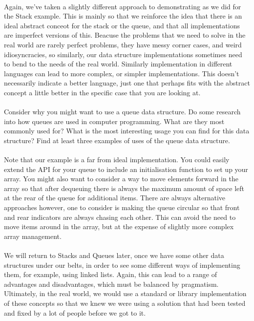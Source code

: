 \documentclass[10pt, a4paper, twosize]{article}
\begin{document}
\paragraph{} Again, we've taken a slightly different approach to demonstrating as we did for the Stack example. This is mainly so that we reinforce the idea that there is an ideal abstract conceot for the stack or the queue, and that all implementations are imperfect versions of this. Beacuse the problems that we need to solve in the real world are rarely perfect problems, they have messy corner cases, and weird idiosyncracies, so similarly, our data structure implementations sometimes need to bend to the needs of the real world. Similarly implementation in different languages can lead to more complex, or simpler implementations. This doesn't necessarily indicate a better language, just one that perhaps fits with the abstract concept a little better in the specific case that you are looking at.

\paragraph{} Consider why you might want to use a queue data structure. Do some research into how queues are used in computer programming. What are they most commonly used for? What is the most interesting usage you can find for this data structure? Find at least three examples of uses of the queue data structure.

\paragraph{} Note that our example is a far from ideal implementation. You could easily extend the API for your queue to include an initialisation function to set up your array. You might also want to consider a way to move elements forward in the array so that after dequeuing there is always the maximum amount of space left at the rear of the queue for additional items. There are always alternative approaches however, one to consider is making the queue circular so that front and rear indicators are always chasing each other. This can avoid the need to move items around in the array, but at the expense of slightly more complex array management.

\paragraph{} We will return to Stacks and Queues later, once we have some other data structures under our belts, in order to see some different ways of implementing them, for example, using linked lists. Again, this can lead to a range of advantages and disadvantages, which must be balanced by pragmatism. Ultimately, in the real world, we would use a standard or library implementation of these concepts so that we knew we were using a solution that had been tested and fixed by a lot of people before we got to it.
\end{document}
